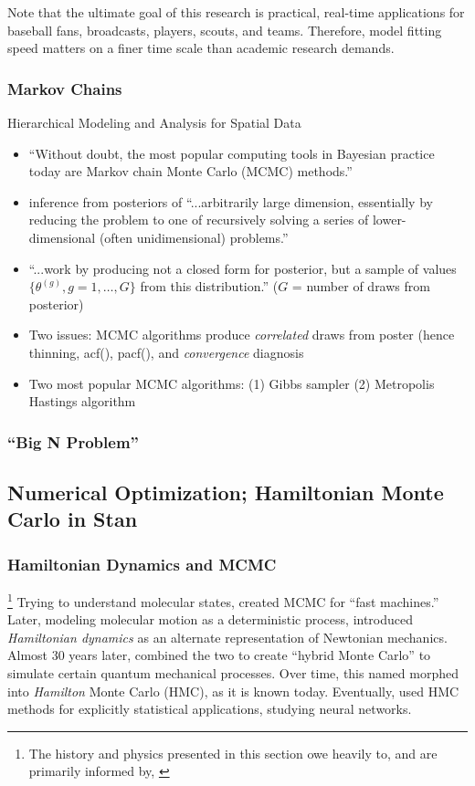 \documentclass{article}
\begin{document}
Note that the ultimate goal of this research is practical, real-time applications for baseball fans, broadcasts, players, scouts, and teams. Therefore, model fitting speed matters on a finer time scale than academic research demands.  

\subsubsection{Markov Chains}

Hierarchical Modeling and Analysis for Spatial Data \citep{Banerjee2014}
        \begin{itemize} %
        \item ``Without doubt, the most popular computing tools in Bayesian practice today are Markov chain Monte Carlo (MCMC) methods.'' 
        \item inference from posteriors of ``...arbitrarily large dimension, essentially by reducing the problem to one of recursively solving a series of lower-dimensional (often unidimensional) problems.'' 
        \item ``...work by producing not a closed form for posterior, but a sample of values $\{\theta^{(g)}, g = 1, \dots, G\}$ from this distribution.'' ($G$ = number of draws from posterior) 
        \item Two issues: MCMC algorithms produce {\it correlated} draws from poster (hence thinning, acf(), pacf(), and {\it convergence} diagnosis 
        \item Two most popular MCMC algorithms: (1) Gibbs sampler (2) Metropolis Hastings algorithm
        \end{itemize} %

\subsubsection{``Big N Problem''}

\subsection{Numerical Optimization; Hamiltonian Monte Carlo in Stan} %

\subsubsection{Hamiltonian Dynamics and MCMC} %

\footnote{The history and physics presented in this section owe heavily to, and are primarily informed by, \citep{Neal2011}} Trying to understand molecular states, \cite{Metropolis1953} created MCMC for ``fast machines.'' Later, modeling molecular motion as a deterministic process, \cite{Alder1959} introduced {\it Hamiltonian dynamics} as an alternate representation of Newtonian mechanics. Almost 30 years later, \cite{Duane1987} combined the two to create ``hybrid Monte Carlo'' to simulate certain quantum mechanical processes. Over time, this named morphed into {\it Hamilton} Monte Carlo (HMC), as it is known today. Eventually, \cite{Neal1996} used HMC methods for explicitly statistical applications, studying neural networks.
\end{document}
